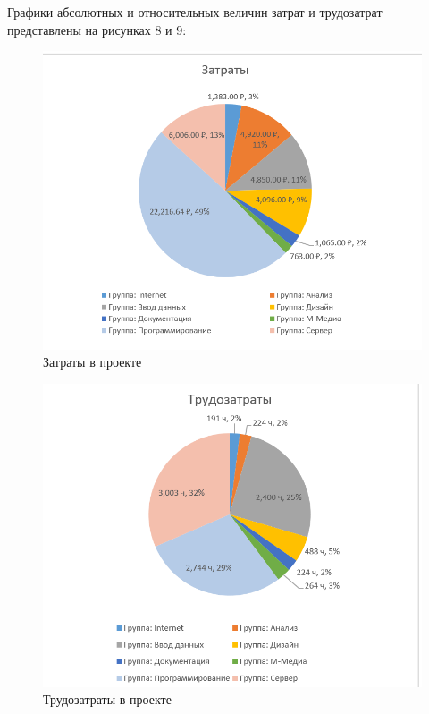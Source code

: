 Графики абсолютных и относительных величин затрат и трудозатрат представлены на рисунках 8 и 9:
\FloatBarrier
\begin{figure}[h]	
	\begin{center}
		\includegraphics[width=\linewidth]{inc/zp.png}
	\end{center}
	\captionsetup{justification=centering}
	\caption{Затраты в проекте}
\end{figure}
\FloatBarrier 

\FloatBarrier
\begin{figure}[h]	
	\begin{center}
		\includegraphics[width=\linewidth]{inc/trud.png}
	\end{center}
	\captionsetup{justification=centering}
	\caption{Трудозатраты в проекте}
\end{figure}
\FloatBarrier 

